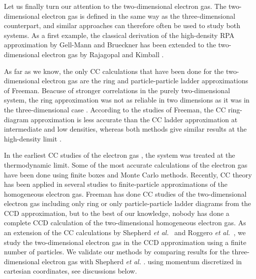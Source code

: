 \documentclass[aps,twocolumn,showpacs,floatfix,nofootinbib,preprintnumbers,superscriptaddress,amsmath,amssymb]{revtex4-1}
\begin{document}
Let us finally turn our attention to the two-dimensional
electron gas. The two-dimensional electron gas is defined
in the same way as the three-dimensional counterpart, and 
similar approaches can therefore often be used to 
study both systems. As a first example, the classical 
derivation of the high-density RPA approximation by Gell-Mann 
and Brueckner \cite{gellmann1957} has been extended to the 
two-dimensional electron gas by Rajagopal and Kimball 
\cite{rajagopal1977}. 

As far as we know, the only CC calculations that have been
done for the two-dimensional electron gas are the ring
\cite{freeman1978} and particle-particle ladder \cite{freeman1983}
approximations of Freeman. Beacuse of stronger correlations
in the purely two-dimensional system, the ring approximation
was not as reliable in two dimensions as it was in the 
three-dimensional case \cite{freeman1978}. According to the 
studies of Freeman, the CC ring-diagram approximation is 
less accurate than the CC ladder approximation at 
intermediate and low densities, whereas both methods give 
similar results at the high-density limit \cite{freeman1983}.


In the earliest CC studies of the 
electron gas \cite{singal1973,freeman1977,bishop1978,
freeman1978,bishop1982,freeman1983}, the system was treated 
at the thermodynamic limit. 
Some of the most accurate calculations of the electron gas
\cite{ceperley1980,tanatar1989,shepherd2012a} have been done using finite boxes and Monte
Carlo methods. Recently, CC theory has been applied in 
several studies \cite{shepherd2012b,shepherd2013a,
shepherd2013b,shepherd2013c,roggero2013} to finite-particle 
approximations of the homogeneous electron gas. 
 Freeman has done CC studies of the two-dimensional 
electron gas including only ring \cite{freeman1978} or 
only particle-particle ladder \cite{freeman1983} diagrams 
from the CCD approximation, but to the best of our knowledge, 
nobody has done a complete CCD calculation of the 
two-dimensional homogeneous electron gas. 
As an extension of the CC calculations by Shepherd 
\emph{et al.}~\cite{shepherd2012b,shepherd2013a,shepherd2013b,shepherd2013c}
and Roggero \emph{et al.}~\cite{roggero2013}, we study
the two-dimensional electron gas in the CCD approximation
using a finite number of particles.
We validate our methods by comparing results 
for the three-dimensional electron gas with Shepherd 
\emph{et al.} \cite{shepherd2012b,shepherd2012c}.
using momentum discretized in cartesian coordinates, see discussions below. 
\end{document}
